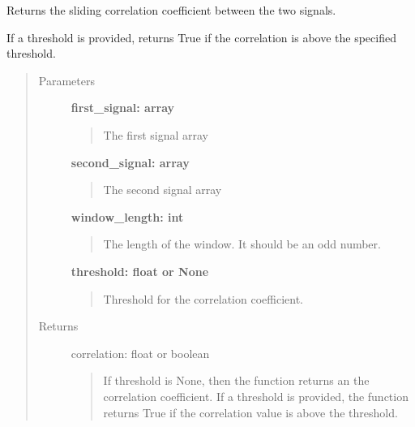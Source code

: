 \documentclass[letterpaper,10pt,english]{sphinxmanual}
\begin{document}
\begin{fulllineitems}
\label{fit_checks:fit_checks.sliding_check_correlation}
Returns the sliding correlation coefficient between the two signals.

If a threshold is provided, returns True if
the correlation is above the specified threshold.
\begin{quote}\begin{description}
\item[{Parameters}] \leavevmode
\textbf{first\_signal: array}
\begin{quote}

The first signal array
\end{quote}

\textbf{second\_signal: array}
\begin{quote}

The second signal array
\end{quote}

\textbf{window\_length: int}
\begin{quote}

The length of the window. It should be an odd number.
\end{quote}

\textbf{threshold: float or None}
\begin{quote}

Threshold for the correlation coefficient.
\end{quote}

\item[{Returns}] \leavevmode
correlation: float or boolean
\begin{quote}

If threshold is None, then the function returns an the correlation coefficient.
If a threshold is provided, the function returns True if the correlation value is
above the threshold.
\end{quote}

\end{description}\end{quote}

\end{fulllineitems}

\end{document}
